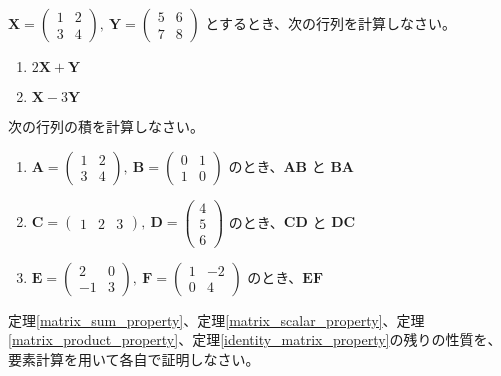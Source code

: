 \begin{quiz}
$\bm{X} = \begin{pmatrix} 1 & 2 \\ 3 & 4 \end{pmatrix},\ \bm{Y} = \begin{pmatrix} 5 & 6 \\ 7 & 8 \end{pmatrix}$ とするとき、次の行列を計算しなさい。
\begin{enumerate}
\item $2\bm{X} + \bm{Y}$
\item $\bm{X} - 3\bm{Y}$
\end{enumerate}
\end{quiz}

\begin{quiz}
次の行列の積を計算しなさい。
\begin{enumerate}
\item $\bm{A} = \begin{pmatrix} 1 & 2 \\ 3 & 4 \end{pmatrix},\ \bm{B} = \begin{pmatrix} 0 & 1 \\ 1 & 0 \end{pmatrix}$ のとき、$\bm{A}\bm{B}$ と $\bm{B}\bm{A}$
\item $\bm{C} = \begin{pmatrix} 1 & 2 & 3 \end{pmatrix},\ \bm{D} = \begin{pmatrix} 4 \\ 5 \\ 6 \end{pmatrix}$ のとき、$\bm{C}\bm{D}$ と $\bm{D}\bm{C}$
\item $\bm{E} = \begin{pmatrix} 2 & 0 \\ -1 & 3 \end{pmatrix},\ \bm{F} = \begin{pmatrix} 1 & -2 \\ 0 & 4 \end{pmatrix}$ のとき、$\bm{E}\bm{F}$
\end{enumerate}
\end{quiz}

\begin{quiz}[定理の証明演習]
定理\ref{matrix_sum_property}、定理\ref{matrix_scalar_property}、定理\ref{matrix_product_property}、定理\ref{identity_matrix_property}の残りの性質を、要素計算を用いて各自で証明しなさい。
\end{quiz}